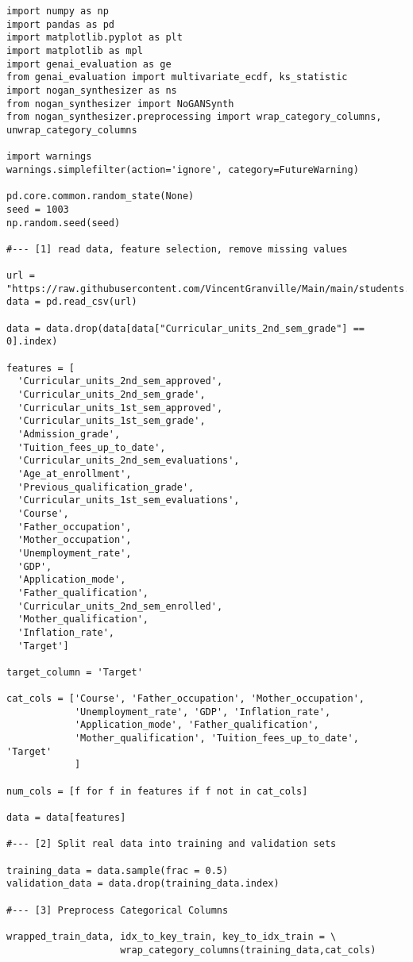 \documentclass[oneside,10pt]{book}
\begin{document}
\begin{lstlisting}
import numpy as np
import pandas as pd
import matplotlib.pyplot as plt
import matplotlib as mpl
import genai_evaluation as ge
from genai_evaluation import multivariate_ecdf, ks_statistic
import nogan_synthesizer as ns
from nogan_synthesizer import NoGANSynth
from nogan_synthesizer.preprocessing import wrap_category_columns, unwrap_category_columns

import warnings
warnings.simplefilter(action='ignore', category=FutureWarning)

pd.core.common.random_state(None)
seed = 1003
np.random.seed(seed)

#--- [1] read data, feature selection, remove missing values

url = "https://raw.githubusercontent.com/VincentGranville/Main/main/students.csv"
data = pd.read_csv(url)

data = data.drop(data[data["Curricular_units_2nd_sem_grade"] == 0].index)

features = [
  'Curricular_units_2nd_sem_approved',
  'Curricular_units_2nd_sem_grade',
  'Curricular_units_1st_sem_approved',
  'Curricular_units_1st_sem_grade',
  'Admission_grade',
  'Tuition_fees_up_to_date',
  'Curricular_units_2nd_sem_evaluations',
  'Age_at_enrollment',
  'Previous_qualification_grade',
  'Curricular_units_1st_sem_evaluations',
  'Course',
  'Father_occupation',
  'Mother_occupation',
  'Unemployment_rate',
  'GDP', 
  'Application_mode',
  'Father_qualification',
  'Curricular_units_2nd_sem_enrolled',
  'Mother_qualification',
  'Inflation_rate',
  'Target']

target_column = 'Target'

cat_cols = ['Course', 'Father_occupation', 'Mother_occupation', 
            'Unemployment_rate', 'GDP', 'Inflation_rate',
            'Application_mode', 'Father_qualification',
            'Mother_qualification', 'Tuition_fees_up_to_date', 'Target'
            ]

num_cols = [f for f in features if f not in cat_cols]

data = data[features]

#--- [2] Split real data into training and validation sets 

training_data = data.sample(frac = 0.5)
validation_data = data.drop(training_data.index)

#--- [3] Preprocess Categorical Columns

wrapped_train_data, idx_to_key_train, key_to_idx_train = \
                    wrap_category_columns(training_data,cat_cols)
                    

\end{lstlisting}
\end{document}
